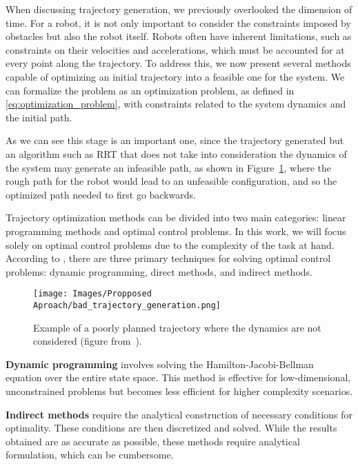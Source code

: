 When discussing trajectory generation, we previously overlooked the dimension of time. For a robot, it is not only important to consider the constraints imposed by obstacles but also the robot itself. Robots often have inherent limitations, such as constraints on their velocities and accelerations, which must be accounted for at every point along the trajectory. To address this, we now present several methods capable of optimizing an initial trajectory into a feasible one for the system. We can formalize the problem as an optimization problem, as defined in \ref{eq:optimization_problem}, with constraints related to the system dynamics and the initial path.

As we can see this stage is an important one, since the trajectory generated but an algorithm such as RRT that does not take into consideration the dynamics of the system may generate an infeasible path, as shown in Figure~\ref{eq:Proposed Approach: Space Cobot: Bad trajectory generation}, where the rough path for the robot would lead to an unfeasible configuration, and so the optimized path needed to first go backwards.

Trajectory optimization methods can be divided into two main categories: linear programming methods and optimal control problems. In this work, we will focus solely on optimal control problems due to the complexity of the task at hand. According to \cite{kelly2017introduction}, there are three primary techniques for solving optimal control problems: dynamic programming, direct methods, and indirect methods.

\begin{figure}[H]
    \centering
    \texttt{[image: Images/Propposed Aproach/bad\_trajectory\_generation.png]}
    \caption{Example of a poorly planned trajectory where the dynamics are not considered (figure from~\cite{bergman2021exploiting}).}
    \label{eq:Proposed Approach: Space Cobot: Bad trajectory generation}
\end{figure}




\textbf{Dynamic programming} involves solving the Hamilton-Jacobi-Bellman equation over the entire state space. This method is effective for low-dimensional, unconstrained problems but becomes less efficient for higher complexity scenarios.

\textbf{Indirect methods} require the analytical construction of necessary conditions for optimality. These conditions are then discretized and solved. While the results obtained are as accurate as possible, these methods require analytical formulation, which can be cumbersome.

